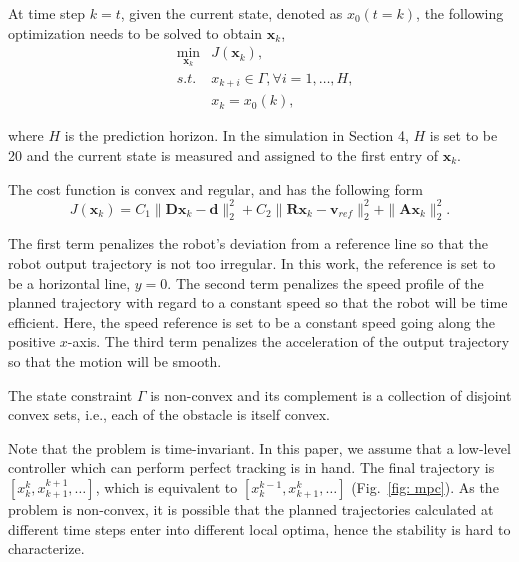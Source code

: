 At time step $k=t$, given the current state, denoted as $x_0(t=k)$, the following optimization needs to be solved to obtain $\mathbf{x}_k$,
\begin{eqnarray}
&\min_{\mathbf{x}_{k}} & J(\mathbf{x}_k),\\
&s.t.& x_{k+i}\in\Gamma,\forall i=1,\ldots,H,\\
&&         x_{k}=x_0(k),
\end{eqnarray}

where $H$ is the prediction horizon. In the simulation in Section 4, $H$ is set to be 20 and the current state is measured and assigned to the first entry of $\mathbf{x}_{k}$.

\begin{assum}[Cost]
The cost function is convex and regular, and has the following form
\begin{equation}
J(\mathbf{x}_k) = C_1\|\mathbf{D}\mathbf{x}_k-\mathbf{d}\|_{2}^2 + C_2 \|\mathbf{R}\mathbf{x}_k-\mathbf{v}_{ref}\|_2^2 +\|\mathbf{A}\mathbf{x}_{k}\|_2^2.  
\end{equation}
\end{assum}

The first term penalizes the robot's deviation from a reference line so that the robot output trajectory is not too irregular. In this work, the reference is set to be a horizontal line, $y=0$. The second term penalizes the speed profile of the planned trajectory with regard to a constant speed so that the robot will be time efficient. Here, the speed reference is set to be a constant speed going along the positive $x$-axis. The third term penalizes the acceleration of the output trajectory so that the motion will be smooth.

\begin{assum}[Constraint]
The state constraint $\Gamma$ is non-convex and its complement is a collection of disjoint convex sets, i.e., each of the obstacle is itself convex.
\end{assum}

Note that the problem is time-invariant. In this paper, we assume that a low-level controller which can perform perfect tracking is in hand. The final trajectory is $[x_k^k,x_{k+1}^{k+1},\ldots]$, which is equivalent to $[x_{k}^{k-1},x_{k+1}^{k},\ldots]$ (Fig.~\ref{fig: mpc}). As the problem is non-convex, it is possible that the planned trajectories calculated at different time steps enter into different local optima, hence the stability is hard to characterize. 

